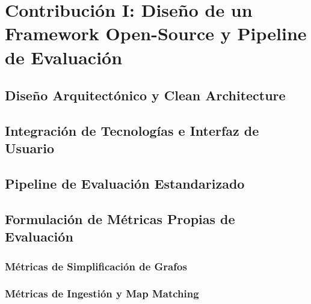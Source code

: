 \chapter{Contribución I: Diseño de un Framework Open-Source y Pipeline de Evaluación}

\section{Diseño Arquitectónico y Clean Architecture}

\section{Integración de Tecnologías e Interfaz de Usuario}

\section{Pipeline de Evaluación Estandarizado}

\section{Formulación de Métricas Propias de Evaluación}
\subsection{Métricas de Simplificación de Grafos}
\subsection{Métricas de Ingestión y Map Matching}
